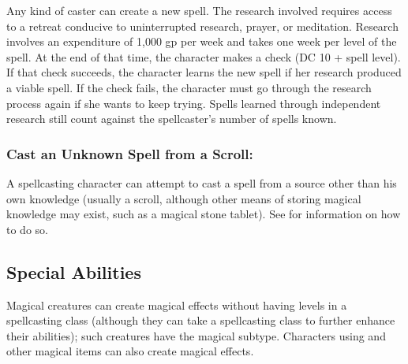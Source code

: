 \documentclass[../VancianToPsionics.tex]{subfiles}
\begin{document}
Any kind of caster can create a new spell. The research involved requires access to a retreat conducive to uninterrupted research, prayer, or meditation. Research involves an expenditure of 1,000 gp per week and takes one week per level of the spell. At the end of that time, the character makes a  check (DC 10 + spell level). If that check succeeds, the character learns the new spell if her research produced a viable spell. If the check fails, the character must go through the research process again if she wants to keep trying. Spells learned through independent research still count against the spellcaster's number of spells known.

\subsubsection{Cast an Unknown Spell from a Scroll:}
A spellcasting character can attempt to cast a spell from a source other than his own knowledge (usually a scroll, although other means of storing magical knowledge may exist, such as a magical stone tablet). See  for information on how to do so.


% 
\subsection{Special Abilities}
Magical creatures can create magical effects without having levels in a spellcasting class (although they can take a spellcasting class to further enhance their abilities); such creatures have the magical subtype. Characters using  and other magical items can also create magical effects.
\end{document}
